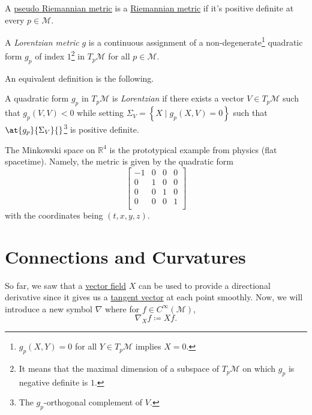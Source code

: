 \begin{note}
	A \hyperref[def:pseudo-Riemannian-metric]{pseudo Riemannian metric} is a \hyperref[def:Riemannian-metric]{Riemannian metric} if it's positive definite at every \(p\in \mathcal{M} \).
\end{note}

\begin{definition}\label{def:Lorentzian-metric}
	A \emph{Lorentzian metric} \(g\) is a continuous assignment of a non-degenerate\footnote{\(g_p(X, Y) = 0\) for all \(Y\in T_p \mathcal{M} \) implies \(X = 0\).} quadratic form \(g_p\) of index \(1\)\footnote{It means that the maximal dimension of a subspace of \(T_p \mathcal{M} \) on which \(g_p\) is negative definite is \(1\).} in \(T_p \mathcal{M} \) for all \(p\in \mathcal{M} \).
\end{definition}

An equivalent definition is the following.

\begin{definition}[Lorentzian]\label{def:Lorentzian}
	A quadratic form \(g_p\) in \(T_{p} \mathcal{M} \) is \emph{Lorentzian} if there exists a vector \(V\in T_p \mathcal{M} \) such that \(g_p(V, V) < 0\) while setting \(\Sigma _V = \left\{ X \mid g_p(X, V) = 0 \right\}\) such that \(\at{g_p}{\Sigma _V}{} \)\footnote{The \(g_p\)-orthogonal complement of \(V\).} is positive definite.
\end{definition}

\begin{eg}
	The Minkowski space on \(\mathbb{R} ^4\) is the prototypical example from physics (flat spacetime). Namely, the metric is given by the quadratic form
	\[
		\begin{bmatrix}
			-1 & 0 & 0 & 0 \\
			0  & 1 & 0 & 0 \\
			0  & 0 & 1 & 0 \\
			0  & 0 & 0 & 1 \\
		\end{bmatrix}
	\]
	with the coordinates being \((t, x, y, z)\).
\end{eg}

\chapter{Connections and Curvatures}
So far, we saw that a \hyperref[def:vector-field]{vector field} \(X\) can be used to provide a directional derivative since it gives us a \hyperref[def:tangent-vector]{tangent vector} at each point smoothly. Now, we will introduce a new symbol \(\nabla \) where for \(f\in C^{\infty} (\mathcal{M} )\),
\[
	\nabla _X f\coloneqq Xf.
\]

